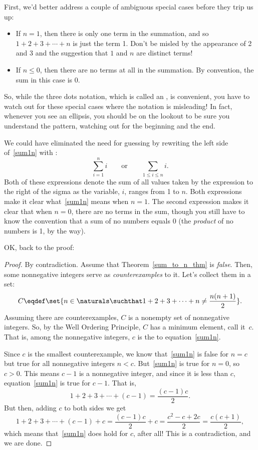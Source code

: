 First, we'd better address a couple of ambiguous special
cases before they trip us up:
\begin{itemize}
\item If $n = 1$, then there is only one term in the summation, and so $1
  + 2 + 3 + \cdots + n$ is just the term 1.  Don't be misled by the
  appearance of 2 and 3 and the suggestion that $1$ and $n$ are distinct
  terms!
\item If $n \leq 0$, then there are no terms at all in the summation.  By
convention, the sum in this case is 0.
\end{itemize}
So, while the three dots notation, which is called an ,
is convenient, you have to watch out for these special cases where the
notation is misleading!  In fact, whenever you see an ellipsis, you
should be on the lookout to be sure you understand the pattern,
watching out for the beginning and the end.

We could have eliminated the need for guessing by rewriting the left side
of~\eqref{sum1n} with :
\[
\sum_{i=1}^n i
\qquad \text{or} \qquad
\sum_{1 \leq i \leq n} i.
\]
Both of these expressions denote the sum of all values taken by the
expression to the right of the sigma as the variable, $i$, ranges from
1 to $n$.  Both expressions make it clear what~\eqref{sum1n} means
when $n=1$.  The second expression makes it clear that when $n=0$,
there are no terms in the sum, though you still have to know the
convention that a sum of no numbers equals 0 (the \emph{product} of no
numbers is 1, by the way).

OK, back to the proof:
\begin{proof}
By contradiction.  Assume that Theorem~\ref{sum_to_n_thm} is
\emph{false}.  Then, some nonnegative integers serve as
\emph{counterexamples} to it. Let's collect them in a set:
\[
C \eqdef \set{n\in\naturals \suchthat 
        1 + 2 + 3 + \cdots + n \neq \frac{n(n+1)}{2}}.
\]
Assuming there are counterexamples, $C$ is a nonempty set of
nonnegative integers.  So, by the Well Ordering Principle, $C$ has a
minimum element, call it~$c$.  That is, among the nonnegative
integers, $c$ is the \emph{} to
equation~\eqref{sum1n}.

Since $c$ is the smallest counterexample, we know that~\eqref{sum1n} is
false for $n=c$ but true for all nonnegative integers $n<c$.
But~\eqref{sum1n} is true for $n=0$, so $c > 0$.  This means $c-1$ is a
nonnegative integer, and since it is less than $c$, equation~\eqref{sum1n}
is true for $c-1$.  That is,
\[
        1 + 2 + 3 + \cdots + (c-1) = \frac{(c-1)c}{2}.
\]
But then, adding $c$ to both sides we get
\[
1 + 2 + 3 + \cdots + (c-1) + c 
        = \frac{(c-1)c}{2} + c
        = \frac{c^2 - c + 2c}{2} 
        = \frac{c(c+1)}{2},
\]
which means that~\eqref{sum1n} does hold for $c$, after all!  This is a
contradiction, and we are done.
\end{proof}


